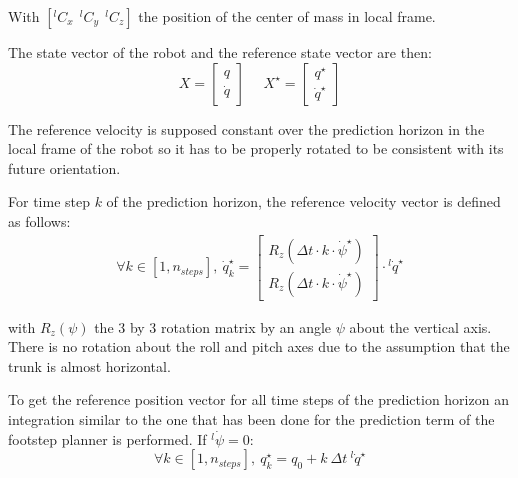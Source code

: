 \documentclass[a4paper,11pt]{article}
\begin{document}
With $[{}^l\! C_x ~~ {}^l\! C_y ~~ {}^l\! C_z ]$ the position of the center of mass in local frame.

The state vector of the robot and the reference state vector are then: 
\begin{equation}X = \begin{bmatrix} q \\ \dot q \end{bmatrix} \text{~~~~}X^\star = \begin{bmatrix} q^{\star} \\ \dot q^{\star} \end{bmatrix}\end{equation}

The reference velocity is supposed constant over the prediction horizon in the local frame of the robot so it has to be properly rotated to be consistent with its future orientation.

For time step $k$ of the prediction horizon, the reference velocity vector is defined as follows:
\begin{align}
\forall k \in [1, n_{steps}], ~ \dot q_k^\star = \begin{bmatrix} R_z(\Delta t \cdot k \cdot \dot \psi^\star) \\ R_z(\Delta t \cdot k \cdot \dot \psi^\star) \end{bmatrix} \cdot {}^l\! \dot q^\star
\end{align}

with $R_z(\psi)$ the 3 by 3 rotation matrix by an angle $\psi$ about the vertical axis. There is no rotation about the roll and pitch axes due to the assumption that the trunk is almost horizontal.


To get the reference position vector for all time steps of the prediction horizon an integration similar to the one that has been done for the prediction term of the footstep planner is performed. If ${}^l\!\dot \psi = 0$:
\begin{equation}
\forall k \in [1, n_{steps}], ~ q_{k}^\star = q_0 + k ~ \Delta t ~  {}^l\! \dot q^\star
\end{equation}
\end{document}

